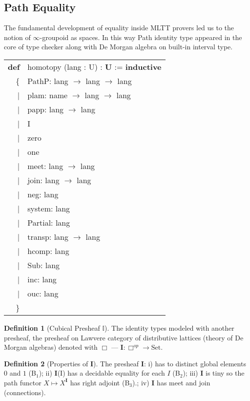 \documentclass{article}
\theoremstyle{definition}
\newtheorem{definition}{Definition}
\newcommand{\tabstyle}[0]{\scriptsize\ttfamily\fontseries{l}\selectfont}
\begin{document}
\newpage
\subsection{Path Equality}

The fundamental development of equality inside MLTT provers led us to the
notion of $\infty$-groupoid as spaces. In this way Path identity type appeared
in the core of type checker along with De Morgan algebra on built-in interval type.

\begin{table}[ht]
\tabstyle
\begin{tabular}{rl}
     \textbf{def} & homotopy (lang : U) : \textbf{U} := \textbf{inductive} \\
               \{ & PathP: lang $\rightarrow$ lang $\rightarrow$ lang \\
  |& plam: name $\rightarrow$ lang $\rightarrow$ lang \\
  |& papp: lang $\rightarrow$ lang \\
  |& I \\
  |& zero \\
  |& one \\
  |& meet: lang $\rightarrow$ lang \\
  |& join: lang $\rightarrow$ lang \\
  |& neg: lang \\
  |& system: lang \\
  |& Partial: lang \\
  |& transp: lang $\rightarrow$ lang \\
  |& hcomp: lang \\
  |& Sub: lang \\
  |& inc: lang \\
  |& ouc: lang \\
 \}& \\
\end{tabular}
\end{table}

\begin{definition}[Cubical Presheaf $\mathbb{I}$]
The identity types modeled with another presheaf, the presheaf on Lawvere
category of distributive lattices (theory of De Morgan algebras) denoted
with $\Box$ — $\textbf{I} : \Box^{op} \rightarrow \textrm{Set}$.
\end{definition}

\begin{definition}[Properties of $\textbf{I}$] The presheaf $\textbf{I}$:
i) has to distinct global elements $0$ and $1$ (B$_1$);
ii) $\textbf{I}$(I) has a decidable equality for each $I$ (B$_2$);
iii) $\textbf{I}$ is tiny so the path functor $X \mapsto X^\textbf{I}$ has right adjoint (B$_3$).;
iv) $\textbf{I}$ has meet and join (connections).
\end{definition}
\end{document}
